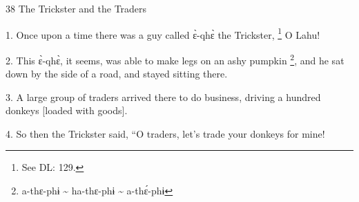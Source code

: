 
38 The Trickster and the Traders

1. Once upon a time there was a guy called ɛ̀-qhɛ̀ the Trickster, \footnote{See DL: 129.} O Lahu!

2. This ɛ̀-qhɛ̀, it seems, was able to make legs on an ashy pumpkin \footnote{a-thɛ-phɨ \textasciitilde{} ha-thɛ-phɨ \textasciitilde{} a-thɛ́-phɨ}, and
he sat down by the side of a road, and stayed sitting there.

3. A large group of traders arrived there to do business, driving a hundred donkeys
[loaded with goods].

4. So then the Trickster said, ``O traders, let's trade your donkeys for mine!
